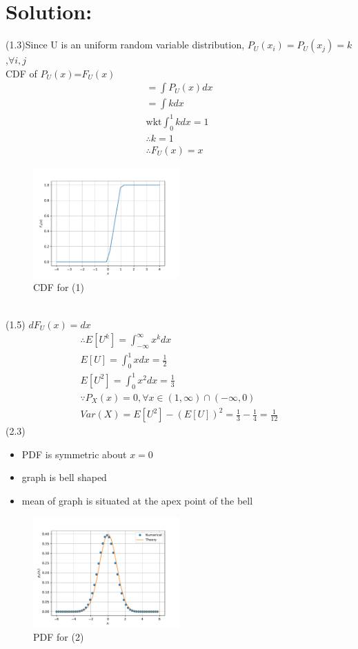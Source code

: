 \documentclass[journal,12pt,twocolumn]{IEEEtran}
\begin{document}
	\section{Solution:}
(1.3)Since U is an uniform random variable distribution, $P_{U}(x_{i})=P_{U}(x_{j})=k$,$\forall i,j$\\
	CDF of $P_{U}(x)$=$F_{U}(x)$\\
	\begin{align}
	=\int P_{U}(x) dx\\
	=\int k dx\\
  \text{wkt} \int_{0}^{1} kdx=1\\
  \therefore k=1\\
  \therefore F_{U}(x)=x
	\end{align}	
		\begin{figure}[h]
\includegraphics[width=0.5\textwidth]{uni_cdf.pdf}
\caption{CDF for (1)}
\label{fig:my_label}
\end{figure}
\\
(1.5) $dF_{U}(x)=dx$
\begin{align}
\therefore E[U^k]=\int_{-\infty}^{\infty} x^k dx\\
E[U]=\int_{0}^{1} x dx=\frac{1}{2}\\
E[U^2]=\int_{0}^{1} x^2 dx=\frac{1}{3}\\
\because P_{X}(x)=0 ,\forall x \in (1,\infty)\cap (-\infty,0)\\
Var(X)=E[U^2]-(E[U])^2=\frac{1}{3}-\frac{1}{4}=\frac{1}{12}
\end{align}
(2.3) \begin{itemize}
\item PDF is symmetric about $x=0$\\
\item graph is bell shaped\\
\item mean of graph is situated at the apex point of the bell\\
\end{itemize}
		\begin{figure}[h]
\includegraphics[width=0.5\textwidth]{gauss_pdf.pdf}
\caption{PDF for (2)}
\label{fig:my_label}
\end{figure}
\end{document}

